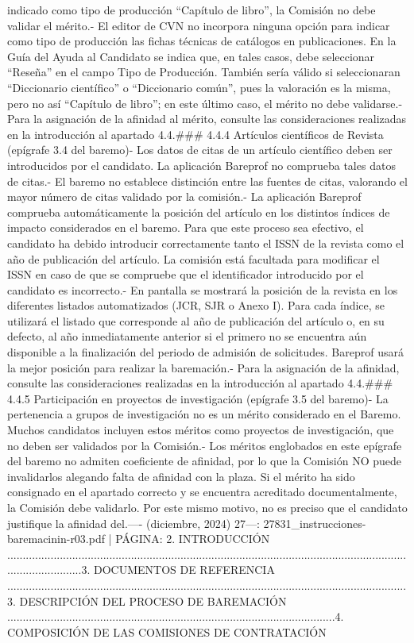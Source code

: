 \documentclass{article}
\begin{document}
\begin{itemize}
indicado como tipo de producción “Capítulo de libro”, la Comisión no debe validar el mérito.\n- El editor de CVN no incorpora ninguna opción para indicar como tipo de producción las fichas técnicas de catálogos en publicaciones. En la Guía del Ayuda al Candidato se indica que, en tales casos, debe seleccionar “Reseña” en el campo Tipo de Producción. También sería válido si seleccionaran “Diccionario científico” o “Diccionario común”, pues la valoración es la misma, pero no así “Capítulo de libro”; en este último caso, el mérito no debe validarse.\n- Para la asignación de la afinidad al mérito, consulte las consideraciones realizadas en la introducción al apartado 4.4.\n\n### 4.4.4 Artículos científicos de Revista (epígrafe 3.4 del baremo)\n\n- Los datos de citas de un artículo científico deben ser introducidos por el candidato. La aplicación Bareprof no comprueba tales datos de citas.\n- El baremo no establece distinción entre las fuentes de citas, valorando el mayor número de citas validado por la comisión.\n- La aplicación Bareprof comprueba automáticamente la posición del artículo en los distintos índices de impacto considerados en el baremo. Para que este proceso sea efectivo, el candidato ha debido introducir correctamente tanto el ISSN de la revista como el año de publicación del artículo. La comisión está facultada para modificar el ISSN en caso de que se compruebe que el identificador introducido por el candidato es incorrecto.\n- En pantalla se mostrará la posición de la revista en los diferentes listados automatizados (JCR, SJR o Anexo I). Para cada índice, se utilizará el listado que corresponde al año de publicación del artículo o, en su defecto, al año inmediatamente anterior si el primero no se encuentra aún disponible a la finalización del periodo de admisión de solicitudes. Bareprof usará la mejor posición para realizar la baremación.\n- Para la asignación de la afinidad, consulte las consideraciones realizadas en la introducción al apartado 4.4.\n\n### 4.4.5 Participación en proyectos de investigación (epígrafe 3.5 del baremo)\n\n- La pertenencia a grupos de investigación no es un mérito considerado en el Baremo. Muchos candidatos incluyen estos méritos como proyectos de investigación, que no deben ser validados por la Comisión.\n- Los méritos englobados en este epígrafe del baremo no admiten coeficiente de afinidad, por lo que la Comisión NO puede invalidarlos alegando falta de afinidad con la plaza. Si el mérito ha sido consignado en el apartado correcto y se encuentra acreditado documentalmente, la Comisión debe validarlo. Por este mismo motivo, no es preciso que el candidato justifique la afinidad del.\n\n----\n{} (diciembre, 2024) 27\n\n---\n\nFUENTE: 27831_instrucciones-baremacinin-r03.pdf | PÁGINA: 2. INTRODUCCIÓN .........................................................................................................................................................3. DOCUMENTOS DE REFERENCIA .................................................................................................................................3. DESCRIPCIÓN DEL PROCESO DE BAREMACIÓN ..........................................................................................................4. COMPOSICIÓN DE LAS COMISIONES DE CONTRATACIÓN 
\end{itemize}
\end{document}
